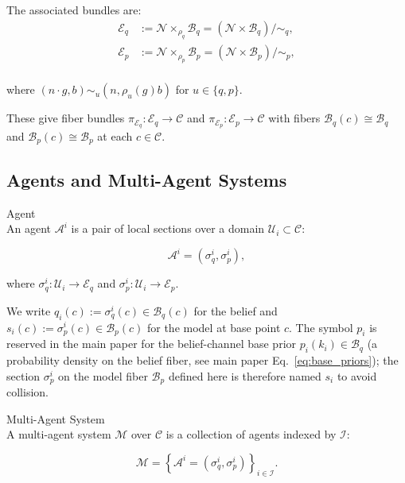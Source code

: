 \documentclass[twoside,11pt]{article}
\begin{document}
The associated bundles are:\\
\begin{align}
\mathcal{E}_q &:= \mathcal{N} \times_{\rho_q} \mathcal{B}_q = \left(\mathcal{N} \times \mathcal{B}_q\right)/\sim_q, \\
\mathcal{E}_p &:= \mathcal{N} \times_{\rho_p} \mathcal{B}_p = \left(\mathcal{N} \times \mathcal{B}_p\right)/\sim_p,
\end{align}\\
where $(n \cdot g, b) \sim_u (n, \rho_u(g)b)$ for $u \in \{q,p\}$.

These give fiber bundles $\pi_{\mathcal{E}_q}: \mathcal{E}_q \to \mathcal{C}$ and $\pi_{\mathcal{E}_p}: \mathcal{E}_p \to \mathcal{C}$ with fibers $\mathcal{B}_q(c) \cong \mathcal{B}_q$ and $\mathcal{B}_p(c) \cong \mathcal{B}_p$ at each $c \in \mathcal{C}$.

\subsection{Agents and Multi-Agent Systems}
Agent\\
An agent $\mathcal{A}^i$ is a pair of local sections over a domain $\mathcal{U}_i \subset \mathcal{C}$:

\begin{equation}
\mathcal{A}^i = \left(\sigma^i_q, \sigma^i_p\right),
\end{equation}

where $\sigma^i_q : \mathcal{U}_i \to \mathcal{E}_q$ and $\sigma^i_p : \mathcal{U}_i \to \mathcal{E}_p$.

We write $q_i(c) := \sigma^i_q(c) \in \mathcal{B}_q(c)$ for the belief and $s_i(c) := \sigma^i_p(c) \in \mathcal{B}_p(c)$ for the model at base point $c$. The symbol $p_i$ is reserved in the main paper for the belief-channel base prior $p_i(k_i) \in \mathcal{B}_q$ (a probability density on the belief fiber, see main paper Eq.~\ref{eq:base_priors}); the section $\sigma^i_p$ on the model fiber $\mathcal{B}_p$ defined here is therefore named $s_i$ to avoid collision.

Multi-Agent System\\
A multi-agent system $\mathcal{M}$ over $\mathcal{C}$ is a collection of agents indexed by $\mathcal{I}$:

\begin{equation}
\mathcal{M} = \left\{\mathcal{A}^i = \left(\sigma^i_q, \sigma^i_p\right)\right\}_{i \in \mathcal{I}}.
\end{equation}
\end{document}

